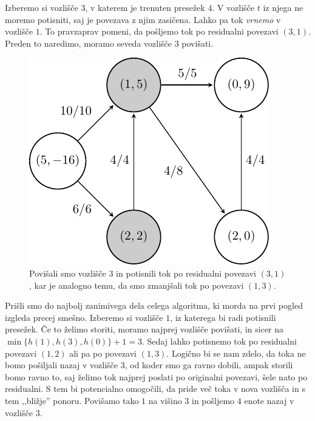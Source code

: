\documentclass[mat1]{fmfdelo}
\begin{document}
Izberemo si vozlišče $3$, v katerem je trenuten presežek $4$. V vozlišče $t$ iz njega ne moremo potisniti, saj je povezava z njim zasičena. Lahko pa tok \textit{vrnemo}
v vozlišče $1$. To pravzaprav pomeni, da pošljemo tok po residualni povezavi $(3,1)$. Preden to naredimo, moramo seveda vozlišče $3$ povišati.

\begin{figure}[H]
  \centering
  \includegraphics{images/graf2-7.pdf}
  \caption{Povišali smo vozlišče $3$ in potisnili tok po residualni povezavi $(3,1)$, kar je analogno temu, da smo zmanjšali tok po povezavi $(1,3)$.}
\end{figure}

Prišli smo do najbolj zanimivega dela celega algoritma, ki morda na prvi pogled izgleda precej smešno. Izberemo si vozlišče $1$, iz katerega bi radi
potisnili presežek. Če to želimo storiti, moramo najprej vozlišče povišati, in sicer na $\min\{h(1), h(3), h(0)\} + 1 = 3$. Sedaj lahko potisnemo tok po residualni
povezavi $(1,2)$ ali pa po povezavi $(1,3)$. Logično bi se nam zdelo, da toka ne bomo pošiljali nazaj v vozlišče $3$, od koder smo ga ravno dobili, ampak storili
bomo ravno to, saj želimo tok najprej poslati po originalni povezavi, šele nato po residualni. S tem bi potencialno omogočili, da pride več toka v nova vozlišča in s tem
,,bližje'' ponoru. Povišamo tako $1$ na višino $3$ in pošljemo $4$ enote nazaj v vozlišče $3$.
\end{document}
